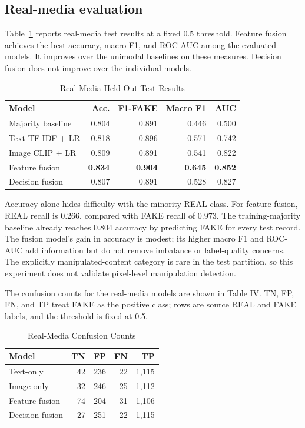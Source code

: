 \documentclass[conference]{IEEEtran}
\begin{document}
\subsection{Real-media evaluation}
Table~\ref{tab:real} reports real-media test results at a fixed 0.5 threshold. Feature fusion achieves the best accuracy, macro F1, and ROC-AUC among the evaluated models. It improves over the unimodal baselines on these measures. Decision fusion does not improve over the individual models.
\begin{table}[t]
\caption{Real-Media Held-Out Test Results}\label{tab:real}\centering\footnotesize
\begin{tabular}{lrrrr}
\hline Model & Acc. & F1-FAKE & Macro F1 & AUC\\\hline
Majority baseline & 0.804 & 0.891 & 0.446 & 0.500\\
Text TF-IDF + LR & 0.818 & 0.896 & 0.571 & 0.742\\
Image CLIP + LR & 0.809 & 0.891 & 0.541 & 0.822\\
Feature fusion & \textbf{0.834} & \textbf{0.904} & \textbf{0.645} & \textbf{0.852}\\
Decision fusion & 0.807 & 0.891 & 0.528 & 0.827\\\hline
\end{tabular}
\end{table}
Accuracy alone hides difficulty with the minority REAL class. For feature fusion, REAL recall is 0.266, compared with FAKE recall of 0.973. The training-majority baseline already reaches 0.804 accuracy by predicting FAKE for every test record. The fusion model's gain in accuracy is modest; its higher macro F1 and ROC-AUC add information but do not remove imbalance or label-quality concerns. The explicitly manipulated-content category is rare in the test partition, so this experiment does not validate pixel-level manipulation detection.

The confusion counts for the real-media models are shown in Table IV. TN, FP, FN, and TP treat FAKE as the positive class; rows are source REAL and FAKE labels, and the threshold is fixed at 0.5.
\begin{table}[t]
\caption{Real-Media Confusion Counts}\label{tab:conf}\centering\footnotesize
\begin{tabular}{lrrrr}
\hline Model & TN & FP & FN & TP\\\hline
Text-only & 42 & 236 & 22 & 1,115\\
Image-only & 32 & 246 & 25 & 1,112\\
Feature fusion & 74 & 204 & 31 & 1,106\\
Decision fusion & 27 & 251 & 22 & 1,115\\\hline
\end{tabular}
\end{table}
\end{document}
